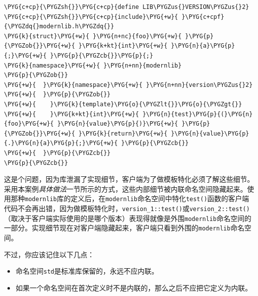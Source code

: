 
\begin{codeblockbg}
\begin{Verbatim}[commandchars=\\\{\},breaklines=true,breakanywhere=true,fontsize=\codefont,xleftmargin=17bp]
\PYG{c+cp}{\PYGZsh{}}\PYG{c+cp}{define LIB\PYGZus{}VERSION\PYGZus{}2}
\PYG{c+cp}{\PYGZsh{}}\PYG{c+cp}{include}\PYG{+w}{ }\PYG{c+cpf}{\PYGZdq{}modernlib.h\PYGZdq{}}
\PYG{k}{struct}\PYG{+w}{ }\PYG{n+nc}{foo}\PYG{+w}{ }\PYG{p}{\PYGZob{}}\PYG{+w}{ }\PYG{k+kt}{int}\PYG{+w}{ }\PYG{n}{a}\PYG{p}{;}\PYG{+w}{ }\PYG{p}{\PYGZcb{}}\PYG{p}{;}
\PYG{k}{namespace}\PYG{+w}{ }\PYG{n+nn}{modernlib}
\PYG{p}{\PYGZob{}}
\PYG{+w}{  }\PYG{k}{namespace}\PYG{+w}{ }\PYG{n+nn}{version\PYGZus{}2}
\PYG{+w}{  }\PYG{p}{\PYGZob{}}
\PYG{+w}{    }\PYG{k}{template}\PYG{o}{\PYGZlt{}}\PYG{o}{\PYGZgt{}}
\PYG{+w}{    }\PYG{k+kt}{int}\PYG{+w}{ }\PYG{n}{test}\PYG{p}{(}\PYG{n}{foo}\PYG{+w}{ }\PYG{n}{value}\PYG{p}{)}\PYG{+w}{ }\PYG{p}{\PYGZob{}}\PYG{+w}{ }\PYG{k}{return}\PYG{+w}{ }\PYG{n}{value}\PYG{p}{.}\PYG{n}{a}\PYG{p}{;}\PYG{+w}{ }\PYG{p}{\PYGZcb{}}
\PYG{+w}{  }\PYG{p}{\PYGZcb{}}
\PYG{p}{\PYGZcb{}}
\end{Verbatim}
\end{codeblockbg}



这是个问题，因为库泄漏了实现细节，客户端为了做模板特化必须了解这些细节。采用本案例\textit{具体做法}一节所示的方式，这些内部细节被内联命名空间隐藏起来。使用那种\texttt{modernlib}库的定义后，在\texttt{modernlib}命名空间中特化\texttt{test()}函数的客户端代码不会再出错，因为做模板特化时，\texttt{version\_\allowbreak{}1::\allowbreak{}test()}或\texttt{version\_\allowbreak{}2::\allowbreak{}test()}（取决于客户端实际使用的是哪个版本）表现得就像是外围\texttt{modernlib}命名空间的一部分。实现细节现在对客户端隐藏起来，客户端只看到外围的\texttt{modernlib}命名空间。



不过，你应该记住以下几点：



\begin{itemize}
\item 命名空间\texttt{std}是标准库保留的，永远不应内联。



\item 如果一个命名空间在首次定义时不是内联的，那么之后不应把它定义为内联。

\end{itemize}


